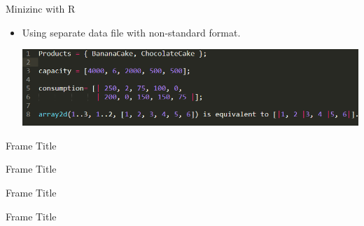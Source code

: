 \documentclass[xcolor=dvipsnames,aspectratio=169]{beamer}
\begin{document}
\begin{frame}{Minizinc with R}
   \begin{itemize}
       \item Using separate data file with non-standard format. 
        
       \includegraphics[scale = 0.65]{minizinc_data.PNG} 
   \end{itemize}
    
\end{frame}



\begin{frame}{Frame Title}
    
\end{frame}

\begin{frame}{Frame Title}
    
\end{frame}

\begin{frame}{Frame Title}
    
\end{frame}

\begin{frame}{Frame Title}
    
\end{frame}
\end{document}

